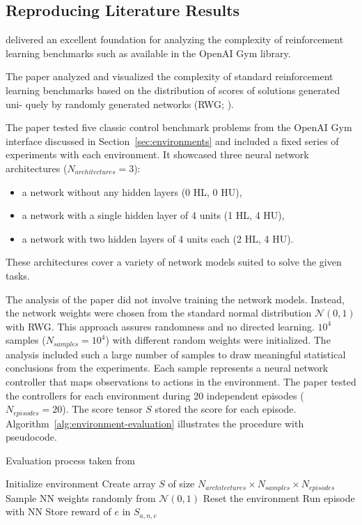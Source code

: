 \subsection{Reproducing Literature Results}
\cite{oller_analyzing_2020} delivered an excellent foundation for analyzing the complexity of reinforcement learning benchmarks such as available in the OpenAI Gym library.

The paper analyzed and visualized the complexity of standard reinforcement learning benchmarks based on the distribution of scores of solutions generated uni- quely by randomly generated networks (RWG; \cite{schmidhuber2001evaluating}).

The paper tested five classic control benchmark problems from the OpenAI Gym interface discussed in Section~\ref{sec:environments} and included a fixed series of experiments with each environment. It showcased three neural network architectures ($N_{architectures}=3$):
\begin{itemize}
  \item a network without any hidden layers (0 HL, 0 HU),
  \item a network with a single hidden layer of 4 units (1 HL, 4 HU),
  \item a network with two hidden layers of 4 units each (2 HL, 4 HU).
\end{itemize}
These architectures cover a variety of network models suited to solve the given tasks.

The analysis of the paper did not involve training the network models. Instead, the network weights were chosen from the standard normal distribution $\mathcal{N}(0,1)$ with RWG. This approach assures randomness and no directed learning. $10^4$ samples ($N_{samples}=10^4$) with different random weights were initialized. The analysis included such a large number of samples to draw meaningful statistical conclusions from the experiments. Each sample represents a neural network controller that maps observations to actions in the environment. The paper tested the controllers for each environment during 20 independent episodes ($N_{episodes}=20$). The score tensor $S$ stored the score for each episode. Algorithm~\ref{alg:environment-evaluation} illustrates the procedure with pseudocode.

\begin{algorithm}
\caption{Evaluation process taken from \cite{oller_analyzing_2020}}
\begin{algorithmic}[1]
\State Initialize environment
\State Create array $S$ of size $N_{architectures} \times N_{samples} \times N_{episodes}$
    \State Sample NN weights randomly from $\mathcal{N}(0,1)$
      \State Reset the environment
      \State Run episode with NN
      \State Store reward of $e$ in $S_{a,n,e}$
    \EndFor
\EndFor
\end{algorithmic}
\label{alg:environment-evaluation}
\end{algorithm}

